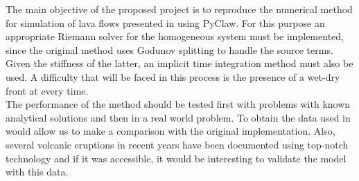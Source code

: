 \documentclass[12pt]{article}
\begin{document}
The main objective of the proposed project is to reproduce the numerical method for simulation of lava flows presented in \cite{costa2005numerical} using PyClaw. For this purpose an appropriate Riemann solver for the homogeneous system must be implemented, since the original method uses Godunov splitting to handle the source terms. Given the stiffness of the latter, an implicit time integration method must also be used. A difficulty that will be faced in this process is the presence of a wet-dry front at every time. \\

The performance of the method should be tested first with problems with known analytical solutions and then in a real world problem. To obtain the data used in \cite{costa2005numerical} would allow us to make a comparison with the original implementation. Also, several volcanic eruptions in recent years have been documented using top-notch technology and if it was accessible, it would be interesting to validate the model with this data.




\end{document}
